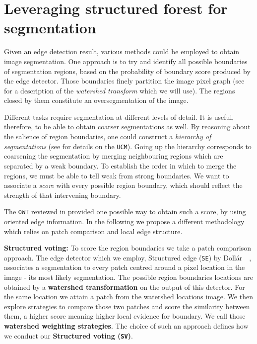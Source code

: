 \chapter{Leveraging structured forest for segmentation}
\label{Chapter4}
Given an edge detection result, various methods could be employed to obtain image segmentation.  One approach is to try and identify all possible boundaries of segmentation regions, based on the probability of boundary score produced by the edge detector. Those boundaries %
finely partition the image pixel graph (see  for a description of the \textit{watershed transform} which we will use). The regions closed by them constitute an oversegmentation of the image. 

Different tasks require segmentation at different levels of detail. It is useful, therefore, to be able to obtain coarser segmentations as well. 
By reasoning about the salience of region boundaries, one could construct a \textit{hierarchy of segmentations} (see  for details on the {\tt UCM}). Going up the hierarchy corresponds to coarsening the segmentation by merging neighbouring regions which are separated by a weak boundary. To establish the order in which to merge the regions, we must be able to tell weak from strong boundaries. We want to associate a \textit{score} with every possible region boundary, which %
should reflect the strength of that intervening boundary.

The {\tt OWT} reviewed in  provided one possible way to obtain such a score, by using oriented edge information. In the following we propose a different methodology which relies on patch comparison and local edge structure.

\textbf{Structured voting:} To score the region boundaries we take a patch comparison approach. The edge detector which we employ, Structured edge ({\tt SE}) by Doll\'ar~\etal~\cite{DollarICCV13edges}, associates a segmentation to every patch centred around a pixel location in the image - its most likely segmentation. The possible region boundaries locations are obtained by a {\bf watershed transformation} on the output of this detector. For the same location we attain a patch from the watershed locations image. We then explore strategies to compare those two patches and score the similarity between them, a higher score meaning higher local evidence for boundary. We call those {\bf watershed weighting strategies}. The choice of such an approach defines how we conduct our \textbf{Structured voting ({\tt SV})}.

